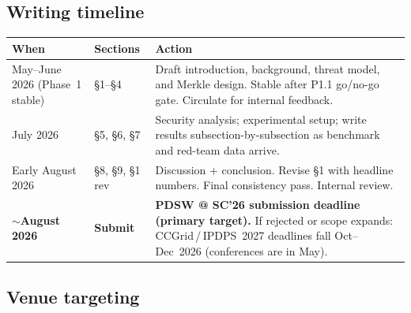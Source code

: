 \documentclass[11pt]{article}
\begin{document}
\subsection*{\textcolor{blue!60!black}{Writing timeline}}

\begin{table}[H]
\centering
\small
\begin{tabular}{@{}p{3.0cm}p{2.2cm}p{7.5cm}@{}}
\toprule
\textbf{When} & \textbf{Sections} & \textbf{Action} \\
\midrule
May--June 2026
  (Phase~1 stable) & \S1--\S4 &
  Draft introduction, background, threat model, and Merkle design.
  Stable after P1.1 go/no-go gate. Circulate for internal feedback. \\
July 2026 & \S5, \S6, \S7 &
  Security analysis; experimental setup; write results
  subsection-by-subsection as benchmark and red-team data arrive. \\
Early August 2026 & \S8, \S9, \S1 rev &
  Discussion + conclusion. Revise \S1 with headline numbers.
  Final consistency pass. Internal review. \\
\textbf{$\sim$August 2026} & \textbf{Submit} &
  \textbf{PDSW @ SC'26 submission deadline (primary target).}
  If rejected or scope expands: CCGrid\,/\,IPDPS~2027 deadlines fall
  Oct--Dec~2026 (conferences are in May). \\
\bottomrule
\end{tabular}
\end{table}

\subsection*{\textcolor{blue!60!black}{Venue targeting}}
\end{document}
